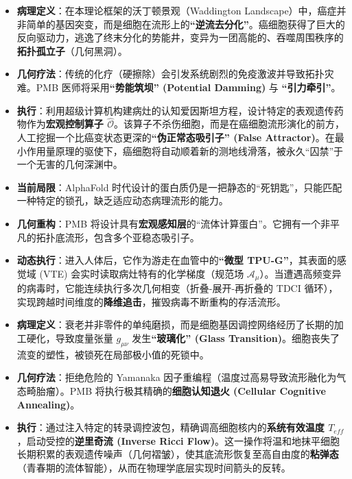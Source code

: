 
\begin{itemize}
    \item \textbf{病理定义}：在本理论框架的沃丁顿景观（Waddington Landscape）中，癌症并非简单的基因突变，而是细胞在流形上的\textbf{“逆流去分化”}。癌细胞获得了巨大的反向驱动力，逃逸了终末分化的势能井，变异为一团高能的、吞噬周围秩序的\textbf{拓扑孤立子}（几何黑洞）。
    \item \textbf{几何疗法}：传统的化疗（硬擦除）会引发系统剧烈的免疫激波并导致拓扑灾难。PMB 医师将采用\textbf{“势能筑坝” (Potential Damming)} 与 \textbf{“引力牵引”}。
    \item \textbf{执行}：利用超级计算机构建病灶的认知爱因斯坦方程，设计特定的表观遗传药物作为\textbf{宏观控制算子 $\hat{\mathcal{O}}$}。该算子不杀伤细胞，而是在癌细胞流形演化的前方，人工挖掘一个比癌变状态更深的\textbf{“伪正常态吸引子” (False Attractor)}。在最小作用量原理的驱使下，癌细胞将自动顺着新的测地线滑落，被永久“囚禁”于一个无害的几何深渊中。
\end{itemize}


\begin{itemize}
    \item \textbf{当前局限}：AlphaFold 时代设计的蛋白质仍是一把静态的“死钥匙”，只能匹配一种特定的锁孔，缺乏适应动态病理流形的能力。
    \item \textbf{几何重构}：PMB 将设计具有\textbf{宏观感知层}的“流体计算蛋白”。它拥有一个非平凡的拓扑底流形，包含多个亚稳态吸引子。
    \item \textbf{动态执行}：进入人体后，它作为游走在血管中的\textbf{“微型 TPU-G”}，其表面的感觉域 (VTE) 会实时读取病灶特有的化学梯度（规范场 $\mathcal{A}_\mu$）。当遭遇高频变异的病毒时，它能连续执行多次几何相变（折叠-展开-再折叠的 TDCI 循环），实现跨越时间维度的\textbf{降维追击}，摧毁病毒不断重构的存活流形。
\end{itemize}


\begin{itemize}
    \item \textbf{病理定义}：衰老并非零件的单纯磨损，而是细胞基因调控网络经历了长期的加工硬化，导致度量张量 $g_{\mu\nu}$ 发生\textbf{“玻璃化” (Glass Transition)}。细胞丧失了流变的塑性，被锁死在局部极小值的死锁中。
    \item \textbf{几何疗法}：拒绝危险的 Yamanaka 因子重编程（温度过高易导致流形融化为气态畸胎瘤）。PMB 将执行极其精确的\textbf{细胞认知退火 (Cellular Cognitive Annealing)}。
    \item \textbf{执行}：通过注入特定的转录调控波包，精确调高细胞核内的\textbf{系统有效温度 $T_{eff}$}，启动受控的\textbf{逆里奇流 (Inverse Ricci Flow)}。这一操作将温和地抹平细胞长期积累的表观遗传噪声（几何褶皱），使其底流形恢复至高自由度的\textbf{粘弹态}（青春期的流体智能），从而在物理学底层实现时间箭头的反转。
\end{itemize}


